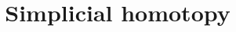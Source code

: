 \documentclass{ximera}
\title{Simplicial homotopy}
\begin{document}
\begin{abstract}

\end{abstract}
\maketitle

\end{document}
